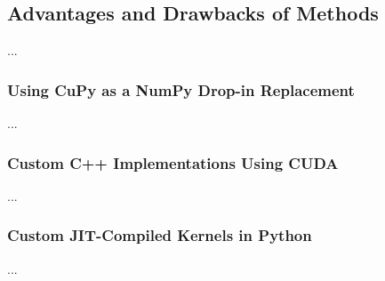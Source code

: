 \subsection{Advantages and Drawbacks of Methods}
...

\subsubsection{Using CuPy as a NumPy Drop-in Replacement}
...

\subsubsection{Custom C++ Implementations Using CUDA}
...

\subsubsection{Custom JIT-Compiled Kernels in Python}
...
